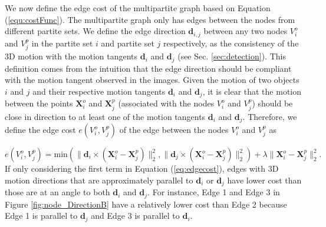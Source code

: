 We now define the edge cost of the multipartite graph based on Equation (\ref{equ:costFunc}).
The multipartite graph only has edges between the nodes from different partite sets.
We define the edge direction $\mathbf{d}_{i,j}$ between any two nodes $V_i^o$ and $V_j^p$ in the partite set $i$ and partite set $j$ respectively, as the consistency of the 3D motion with the motion tangents $\mathbf d_i$ and $\mathbf d_j$ (see Sec. \ref{sec:detection}). This definition comes from the intuition that the edge direction should be compliant with the motion tangent observed in the images. Given the motion of two objects $i$ and $j$ and their respective motion tangents $\mathbf d_i$ and $\mathbf d_j$, it is clear that the motion between the points $\mathbf{X}_i^o$ and $\mathbf{X}_j^p$ (associated with the nodes $V_i^o$ and $V_j^p$) should be close in direction to at least one of the motion tangents $\mathbf d_i$ and $\mathbf d_j$.
Therefore, we define the edge cost $e(V_i^o,V_j^p)$ of the edge between the nodes $V_i^o$ and $V_j^p$ as

\begin{equation}
\label{eq:edgecost}
e(V_i^o,V_j^p)=\text{min}(\|\mathbf{d}_i\times(\mathbf{X}_i^{o}-\mathbf{X}_j^{p})\|_2^2, \|\mathbf{d}_j\times(\mathbf{X}_i^{o}-\mathbf{X}_j^{p})\|_2^2) +\lambda\|\mathbf{X}_i^{o}-\mathbf{X}_j^{p}\|_2^2.
\end{equation}
If only considering the first term in Equation (\ref{eq:edgecost}), edges with 3D motion directions that are approximately parallel to $\mathbf{d}_i$ or $\mathbf{d}_j$ have lower  cost than those are at an angle to both $\mathbf{d}_i$ and $\mathbf{d}_j$. For instance, %
Edge 1 and Edge 3 in Figure \ref{fig:node_DirectionB} have a relatively lower cost than Edge 2 because Edge 1 is parallel to $\mathbf{d}_j$ and Edge 3 is parallel to $\mathbf{d}_i$.

